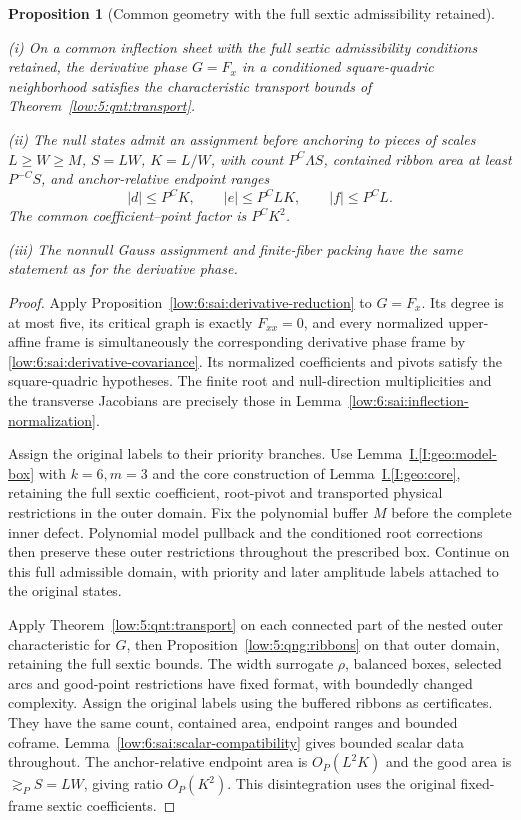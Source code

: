 \documentclass[11pt]{amsart}
\newtheorem{proposition}[theorem]{Proposition}
\theoremstyle{definition}
\theoremstyle{remark}
\numberwithin{equation}{section}
\newcommand{\partIref}[1]{\hyperref[I:#1]{I.\ref*{I:#1}}}
\begin{document}
\begin{proposition}[Common geometry with the full sextic admissibility retained]\label{low:6:sai:common-inflection-geometry}

\noindent\textup{(i)} On a common inflection sheet with the full sextic admissibility conditions retained, the derivative phase $G=F_x$ in a conditioned square-quadric neighborhood satisfies the characteristic transport bounds of Theorem~\ref{low:5:qnt:transport}.

\noindent\textup{(ii)} The null states admit an assignment before anchoring to pieces of scales $L\ge W\ge M$, $S=LW$, $K=L/W$, with count $P^C\Lambda S$, contained ribbon area at least $P^{-C}S$, and anchor-relative endpoint ranges
\[
|d|\le P^CK,\qquad |e|\le P^CLK,\qquad |f|\le P^CL.
\]
The common coefficient--point factor is $P^CK^2$.

\noindent\textup{(iii)} The nonnull Gauss assignment and finite-fiber packing have the same statement as for the derivative phase. 
\end{proposition}
\begin{proof}
Apply Proposition~\ref{low:6:sai:derivative-reduction} to $G=F_x$. Its degree is at most five, its critical graph is exactly $F_{xx}=0$, and every normalized upper-affine frame is simultaneously the corresponding derivative phase frame by \eqref{low:6:sai:derivative-covariance}. Its normalized coefficients and pivots satisfy the square-quadric hypotheses. The finite root and null-direction multiplicities and the transverse Jacobians are precisely those in Lemma~\ref{low:6:sai:inflection-normalization}.

Assign the original labels to their priority branches. Use Lemma~\partIref{geo:model-box} with $k=6,m=3$ and the core construction of Lemma~\partIref{geo:core}, retaining the full sextic coefficient, root-pivot and transported physical restrictions in the outer domain. Fix the polynomial buffer $M$ before the complete inner defect. Polynomial model pullback and the conditioned root corrections then preserve these outer restrictions throughout the prescribed box. Continue on this full admissible domain, with priority and later amplitude labels attached to the original states.

Apply Theorem~\ref{low:5:qnt:transport} on each connected part of the nested outer characteristic for $G$, then Proposition~\ref{low:5:qng:ribbons} on that outer domain, retaining the full sextic bounds. The width surrogate $\rho$, balanced boxes, selected arcs and good-point restrictions have fixed format, with boundedly changed complexity. Assign the original labels using the buffered ribbons as certificates. They have the same count, contained area, endpoint ranges and bounded coframe. Lemma~\ref{low:6:sai:scalar-compatibility} gives bounded scalar data throughout. The anchor-relative endpoint area is $O_P(L^2K)$ and the good area is $\gtrsim_PS=LW$, giving ratio $O_P(K^2)$. This disintegration uses the original fixed-frame sextic coefficients.
\end{proof}
\end{document}
